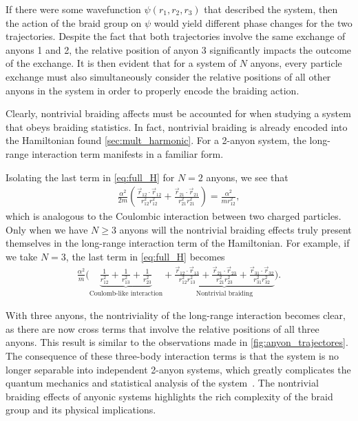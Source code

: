 If there were some wavefunction $\psi(r_1,r_2,r_3)$ that described the system, then the action of the braid group on $\psi$ would yield different phase changes for the two trajectories.
Despite the fact that both trajectories involve the same exchange of anyons 1 and 2, the relative position of anyon 3 significantly impacts the outcome of the exchange. It is then evident that for a system of $N$ anyons, every particle exchange must also simultaneously consider the relative positions of all other anyons in the system in order to properly encode the braiding action.

Clearly, nontrivial braiding affects must be accounted for when studying a system that obeys braiding statistics. In fact, nontrivial braiding is already encoded into the Hamiltonian found \cref{sec:mult_harmonic}. For a 2-anyon system, the long-range interaction term manifests in a familiar form. 

Isolating the last term in \cref{eq:full_H} for $N=2$ anyons, we see that
\begin{align*}
    \frac{\alpha^2}{2m}\left( \frac{\vec{r}_{12}\cdot\vec{r}_{12}}{r_{12}^2r_{12}^2} + \frac{\vec{r}_{21}\cdot\vec{r}_{21}}{r_{21}^2r_{21}^2} \right)  = \frac{\alpha^2}{mr_{12}^2},
\end{align*}
which is analogous to the Coulombic interaction between two charged particles.
Only when we have $N\geq 3$ anyons will the nontrivial braiding effects truly present themselves in the long-range interaction term of the Hamiltonian. For example, if we take $N=3$, the last term in \cref{eq:full_H} becomes
\begin{align*}
    \frac{\alpha^2}{m}\biggl( \underbrace{\frac{1}{r_{12}^2} + \frac{1}{r_{13}^2} + \frac{1}{r_{23}^2}}_{\textrm{Coulomb-like interaction}} + \underbrace{\frac{\vec{r}_{12}\cdot\vec{r}_{13}}{r_{12}^2r_{13}^2} + \frac{\vec{r}_{21}\cdot\vec{r}_{23}}{r_{21}^2r_{23}^2} + \frac{\vec{r}_{31}\cdot\vec{r}_{32}}{r_{31}^2r_{32}^2}}_\textrm{Nontrivial braiding} \biggr).
\end{align*}

With three anyons, the nontriviality of the long-range interaction becomes clear, as there are now cross terms that involve the relative positions of all three anyons. This result is similar to the observations made in \cref{fig:anyon_trajectores}. The consequence of these three-body interaction terms is that the system is no longer separable into independent 2-anyon systems, which greatly complicates the quantum mechanics and statistical analysis of the system~\cite{Khare2005}. The nontrivial braiding effects of anyonic systems highlights the rich complexity of the braid group and its physical implications.